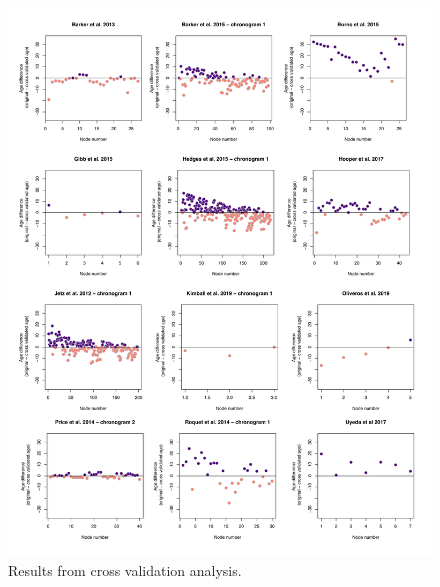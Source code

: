 \documentclass[
  english,
  man]{apa6}
\begin{document}
\begin{figure}[!h]
\includegraphics{../figures/figure-cross-validation/fig-cross-validation-xy-plots-diffs.pdf}
\caption{Results from cross validation analysis.}
\label{fig:cvXYdiffs}
\end{figure}
\end{document}
